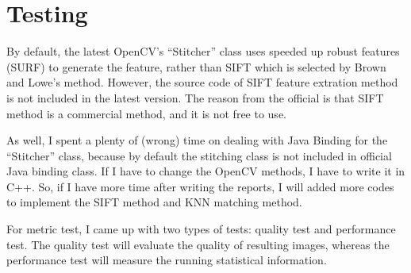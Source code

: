 \documentclass[10pt,twocolumn,letterpaper]{article}
\begin{document}
\section{Testing}
By default, the latest OpenCV's ``Stitcher'' class uses speeded up robust features (SURF) \cite{surf} to generate the feature,
rather than SIFT which is selected by Brown and Lowe's method.
However, the source code of SIFT feature extration method is not included in the latest version.
The reason from the official \cite{cvcontri} is that SIFT method is a commercial method, and it is not free to use.

As well, I spent a plenty of (wrong) time on dealing with Java Binding for the ``Stitcher'' class,
because by default the stitching class is not included in official Java binding class.
If I have to change the OpenCV methods, I have to write it in C++.
So, if I have more time after writing the reports, I will added more codes to implement the SIFT method and KNN matching method.

For metric test, I came up with two types of tests: quality test and performance test.
The quality test will evaluate the quality of resulting images, whereas the performance test will measure the running statistical information.
\end{document}
